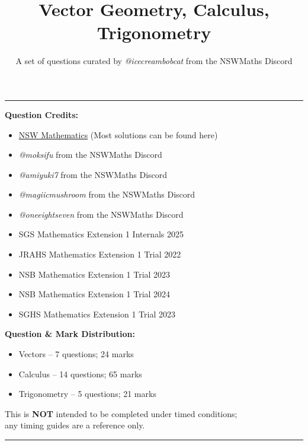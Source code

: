 \documentclass[oneside]{article}[14pt]
\title{\Huge{Vector Geometry, Calculus, Trigonometry}}
\author{\large{A set of questions curated by \textit{@icecreambobcat} from the NSWMaths Discord}}
\date{}
\begin{document}
\newcommand{\HRule}{\rule{\linewidth}{0.5mm}}
\maketitle
\HRule
\vskip 2cm

\textbf{Question Credits:}
\begin{itemize}
	\item \href{https://nswmaths.com}{NSW Mathematics} (Most solutions can be found here)
  \item \textit{@moksifu} from the NSWMaths Discord
  \item \textit{@amiyuki7} from the NSWMaths Discord
  \item \textit{@magiicmushroom} from the NSWMaths Discord
  \item \textit{@oneeightseven} from the NSWMaths Discord
	\item SGS Mathematics Extension 1 Internals 2025
	\item JRAHS Mathematics Extension 1 Trial 2022
	\item NSB Mathematics Extension 1 Trial 2023
	\item NSB Mathematics Extension 1 Trial 2024
	\item SGHS Mathematics Extension 1 Trial 2023
\end{itemize}

\textbf{Question \& Mark Distribution:}
\begin{itemize}
	\item Vectors -- 7 questions; 24 marks
	\item Calculus -- 14 questions; 65 marks
	\item Trigonometry -- 5 questions; 21 marks
\end{itemize}

\vfill

{\LARGE{This is \textbf{NOT} intended to be completed under timed conditions; \\ any timing guides are a reference only.}}

\vfill
\HRule
\newpage
\end{document}
